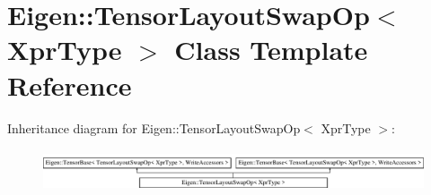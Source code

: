 \hypertarget{class_eigen_1_1_tensor_layout_swap_op}{}\section{Eigen\+:\+:Tensor\+Layout\+Swap\+Op$<$ Xpr\+Type $>$ Class Template Reference}
\label{class_eigen_1_1_tensor_layout_swap_op}
Inheritance diagram for Eigen\+:\+:Tensor\+Layout\+Swap\+Op$<$ Xpr\+Type $>$\+:\begin{figure}[H]
\begin{center}
\leavevmode
\includegraphics[height=1.258427cm]{class_eigen_1_1_tensor_layout_swap_op}
\end{center}
\end{figure}
